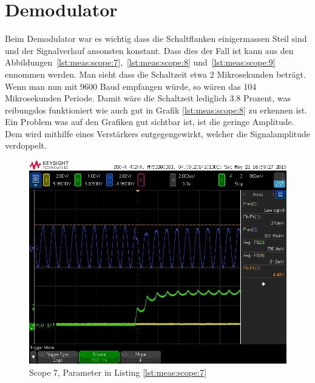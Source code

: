 \section{Demodulator}
\label{sec:val:demodulator}

Beim Demodulator war es wichtig dass die Schaltflanken einigermassen Steil sind und der Signalverlauf ansonsten konstant.
Dass dies der Fall ist kann aus den Abbildungen~\ref{lst:meas:scope:7},~\ref{lst:meas:scope:8} und~\ref{lst:meas:scope:9} ennommen werden.
Man sieht dass die Schaltzeit etwa 2 Mikrosekunden beträgt. Wenn man nun mit 9600 Baud empfangen würde, so wären das 104 Mikrosekunden Periode. Damit wäre die Schaltzeit lediglich 3.8 Prozent, was reibungslos funktioniert wie auch gut in Grafik \ref{lst:meas:scope:8} zu erkennen ist.
Ein Problem was auf den Grafiken gut sichtbar ist, ist die geringe Amplitude. Dem wird mithilfe eines Verstärkers entgegengewirkt, welcher die Signalamplitude verdoppelt.

\begin{figure}[h!tb]
    \centering
    \includegraphics[width=1\textwidth, trim=0mm 21mm 0mm 11mm, clip]{images/scopeShots/scope_7.png}
    \caption{Scope 7, Parameter in Listing \ref{lst:meas:scope:7}}
    \label{fig:meas:scope:7}
\end{figure}

